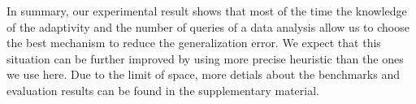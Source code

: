 In summary, our experimental result shows that most of the time the knowledge of the adaptivity and the number of queries of a data analysis allow us to choose the best mechanism to  reduce the generalization error. We expect that this situation can be further improved by using more precise heuristic than the ones we use here. 
Due to the limit of space, more detials about the benchmarks and evaluation results can be found in the supplementary material.



